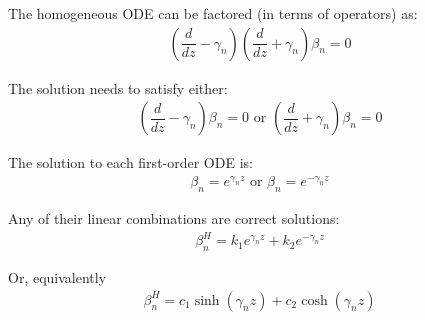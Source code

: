 \begin{solution} 

The homogeneous ODE can be factored (in terms of operators) as:
    \begin{align*}
    (\dfrac{d}{dz}-\gamma_{n}) (\dfrac{d}{dz}+\gamma_{n})\beta_{n}= 0
    \end{align*}

The solution needs to satisfy either:
    \begin{align*}
    (\dfrac{d}{dz}-\gamma_{n})\beta_{n} = 0 \text{  or  } (\dfrac{d}{dz}+\gamma_{n})\beta_{n} = 0
    \end{align*}
    
The solution to each first-order ODE is:
    \begin{align*}
    \beta_{n} = e^{\gamma_{n}z} \text{  or  } \beta_{n} = e^{-\gamma_{n}z}
    \end{align*}

Any of their linear combinations are correct solutions:
    \begin{align*}
    \beta_{n}^{H} = k_1 e^{\gamma_{n}z} + k_2 e^{-\gamma_{n}z}
    \end{align*}

Or, equivalently
    \begin{align*}
      \beta_{n}^{H} = c_{1} \sinh\left(\gamma_{n}z\right) + c_{2} \cosh\left(\gamma_{n}z\right)
    \end{align*}

\end{solution} 
